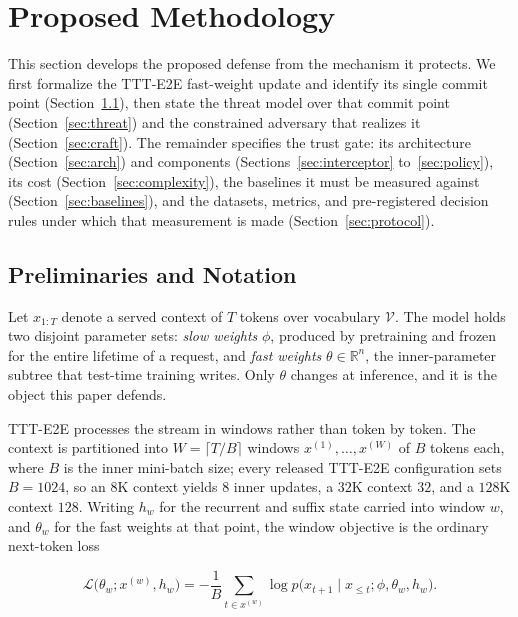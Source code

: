 \documentclass[journal]{IEEEtran}
\newcommand{\slow}{\phi}
\newcommand{\fast}{\theta}
\begin{document}
\section{Proposed Methodology}
\label{sec:method}

This section develops the proposed defense from the mechanism it protects. We first
formalize the TTT-E2E fast-weight update and identify its single commit point
(Section~\ref{sec:prelim}), then state the threat model over that commit point
(Section~\ref{sec:threat}) and the constrained adversary that realizes it
(Section~\ref{sec:craft}). The remainder specifies the trust gate: its architecture
(Section~\ref{sec:arch}) and components (Sections~\ref{sec:interceptor}
to~\ref{sec:policy}), its cost (Section~\ref{sec:complexity}), the baselines it must
be measured against (Section~\ref{sec:baselines}), and the datasets, metrics, and
pre-registered decision rules under which that measurement is made
(Section~\ref{sec:protocol}).

\subsection{Preliminaries and Notation}
\label{sec:prelim}

Let $x_{1:T}$ denote a served context of $T$ tokens over vocabulary $\mathcal{V}$.
The model holds two disjoint parameter sets: \emph{slow weights} $\slow$, produced
by pretraining and frozen for the entire lifetime of a request, and \emph{fast
weights} $\fast \in \mathbb{R}^{n}$, the inner-parameter subtree that test-time
training writes. Only $\fast$ changes at inference, and it is the object this paper
defends.

TTT-E2E processes the stream in windows rather than token by token. The context is
partitioned into $W = \lceil T/B \rceil$ windows $x^{(1)},\dots,x^{(W)}$ of $B$
tokens each, where $B$ is the inner mini-batch size; every released TTT-E2E
configuration sets $B = 1024$, so an $8$K context yields $8$ inner updates, a $32$K
context $32$, and a $128$K context $128$. Writing $h_w$ for the recurrent and suffix
state carried into window $w$, and $\fast_w$ for the fast weights at that point, the
window objective is the ordinary next-token loss

\begin{equation}
\mathcal{L}\big(\fast_w; x^{(w)}, h_w\big)
= -\frac{1}{B}\sum_{t \in x^{(w)}}
\log p\big(x_{t+1} \mid x_{\leq t}; \slow, \fast_w, h_w\big).
\label{eq:innerloss}
\end{equation}
\end{document}
